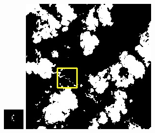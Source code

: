\documentclass[10pt,UTF8,fntef]{ctexart}
\begin{document}
\begin{multicols}{2}
\begin{figure}[H]
{\begin{minipage}[b]{0.15\linewidth}
            \includegraphics[width=1\linewidth]{../log/spoon4/cut/tmp_cut_LC80460282014171LGN00_12556_mask.jpg}\vspace{4pt}
            \includegraphics[width=1\linewidth]{../log/spoon4/cut/LC80980712014024LGN00_15440_mask.jpg}\vspace{4pt}

\end{minipage}}
\end{figure}
\end{multicols}
\end{document}
